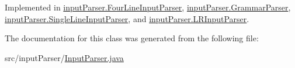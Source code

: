 Implemented in \hyperlink{classinput_parser_1_1_four_line_input_parser_a99c37488d66cfeecb33e13d573b4a81a}{input\-Parser.\-Four\-Line\-Input\-Parser}, \hyperlink{classinput_parser_1_1_grammar_parser_a46c33fdad541b475abc31e44d56eb507}{input\-Parser.\-Grammar\-Parser}, \hyperlink{classinput_parser_1_1_single_line_input_parser_ad822676b0d3182a591e2004c3bcc79d5}{input\-Parser.\-Single\-Line\-Input\-Parser}, and \hyperlink{classinput_parser_1_1_l_r_input_parser_ab1fb2966ece506eead96dcededca86a6}{input\-Parser.\-L\-R\-Input\-Parser}.



The documentation for this class was generated from the following file\-:\begin{DoxyCompactItemize}
\item 
src/input\-Parser/\hyperlink{_input_parser_8java}{Input\-Parser.\-java}\end{DoxyCompactItemize}

